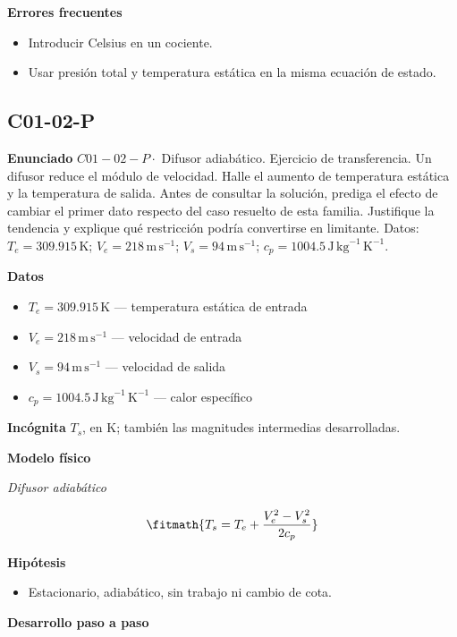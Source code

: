 \documentclass[10pt,openany]{book}
\begin{document}
\noindent\textbf{Errores frecuentes}
\begin{itemize}
\item Introducir Celsius en un cociente.
\item Usar presión total y temperatura estática en la misma ecuación de estado.
\end{itemize}
\subsection*{C01-02-P}

\noindent\textbf{Enunciado}
\(C01-02-P \cdot\) Difusor adiabático. Ejercicio de transferencia. Un difusor reduce el módulo de velocidad. Halle el aumento de temperatura estática y la temperatura de salida. Antes de consultar la solución, prediga el efecto de cambiar el primer dato respecto del caso resuelto de esta familia. Justifique la tendencia y explique qué restricción podría convertirse en limitante. Datos: \(T_e=309.915\, \mathrm{K}\); \(V_e=218\, \mathrm{m}\,\mathrm{s}^{-1}\); \(V_s=94\, \mathrm{m}\,\mathrm{s}^{-1}\); \(c_p=1004.5\, \mathrm{J}\,\mathrm{kg}^{-1}\,\mathrm{K}^{-1}\).

\noindent\textbf{Datos}
\begin{itemize}
\item $T_e = 309.915\,\mathrm{K}$ — temperatura estática de entrada
\item $V_e = 218\,\mathrm{m}\,\mathrm{s}^{-1}$ — velocidad de entrada
\item $V_s = 94\,\mathrm{m}\,\mathrm{s}^{-1}$ — velocidad de salida
\item $c_p = 1004.5\,\mathrm{J}\,\mathrm{kg}^{-1}\,\mathrm{K}^{-1}$ — calor específico
\end{itemize}

\noindent\textbf{Incógnita}
$T_s$, en $\mathrm{K}$; también las magnitudes intermedias desarrolladas.

\noindent\textbf{Modelo físico}

\noindent\textit{Difusor adiabático}

\[
\fitmath{T_s=T_e + \frac{V_e^{2} - V_s^{2}}{2 c_p}}
\]

\noindent\textbf{Hipótesis}
\begin{itemize}
\item Estacionario, adiabático, sin trabajo ni cambio de cota.
\end{itemize}

\noindent\textbf{Desarrollo paso a paso}
\end{document}
